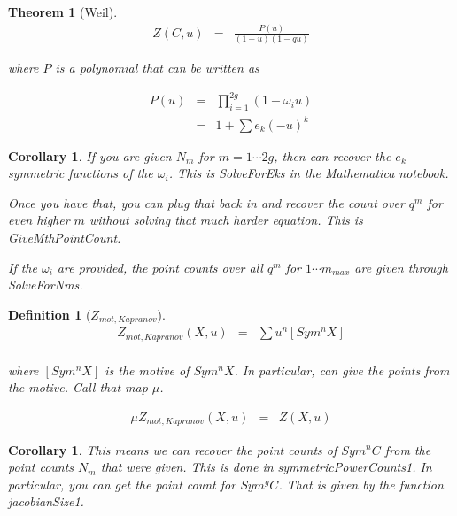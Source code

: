 \documentclass[11pt]{article}
\theoremstyle{change}
\newtheorem{definition}[equation]{Definition}
\newtheorem{thm}[equation]{Theorem}
\newtheorem{cor}[equation]{Corollary}
\theoremstyle{nonumberplain}
\numberwithin{equation}{section}
\begin{document}
\begin{thm}[Weil]
\begin{eqnarray*}
Z (C,u) &=& \frac{P(u)}{(1-u)(1-q u)}
\end{eqnarray*}

where $P$ is a polynomial that can be written as

\begin{eqnarray*}
P(u) &=& \prod_{i=1}^{2g} (1- \omega_i u)\\
&=& 1 + \sum e_k (-u)^k
\end{eqnarray*}

\end{thm}

\begin{cor}
If you are given $N_m$ for $m=1 \cdots 2g$, then can recover the $e_k$ symmetric functions of the $\omega_i$. This is SolveForEks in the Mathematica notebook.

Once you have that, you can plug that back in and recover the count over $q^m$ for even higher $m$ without solving that much harder equation. This is GiveMthPointCount.

If the $\omega_i$ are provided, the point counts over all $q^m$ for $1 \cdots m_{max}$ are given through SolveForNms.
\end{cor}

\begin{definition}[$Z_{mot,Kapranov}$]
\begin{eqnarray*}
Z_{mot,Kapranov} (X,u) &=& \sum u^n [Sym^n X]\\
\end{eqnarray*}

where $[Sym^n X]$ is the motive of $Sym^n X$. In particular, can give the points from the motive. Call that map $\mu$.

\begin{eqnarray*}
\mu Z_{mot,Kapranov} (X,u) &=& Z(X,u)
\end{eqnarray*}

\end{definition}

\begin{cor}
This means we can recover the point counts of $Sym^n C$ from the point counts $N_m$ that were given. This is done in symmetricPowerCounts1. In particular, you can get the point count for $Sym^g C$. That is given by the function jacobianSize1.
\end{cor}
\end{document}
